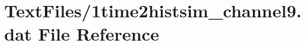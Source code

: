 \hypertarget{1time2histsim__channel9_8dat}{}\section{Text\+Files/1time2histsim\+\_\+channel9.dat File Reference}
\label{1time2histsim__channel9_8dat}
